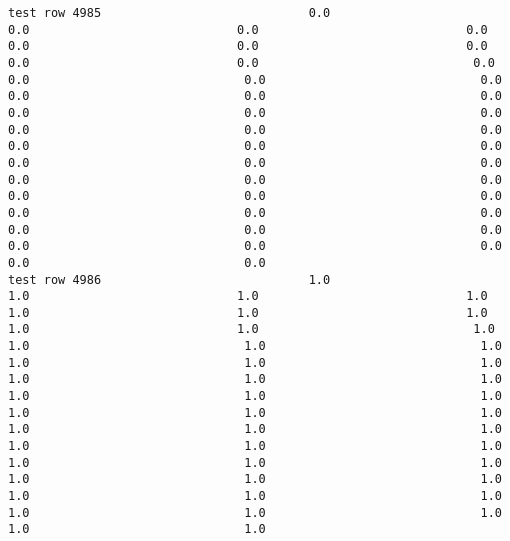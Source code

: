 \documentclass[11pt]{article}
\begin{document}
\begin{verbatim}
test row 4985                             0.0                             0.0                             0.0                             0.0                             0.0                             0.0                             0.0                             0.0                             0.0                              0.0                              0.0                              0.0                              0.0                              0.0                              0.0                              0.0                              0.0                              0.0                              0.0                              0.0                              0.0                              0.0                              0.0                              0.0                              0.0                              0.0                              0.0                              0.0                              0.0                              0.0                              0.0                              0.0                              0.0                              0.0                              0.0                              0.0                              0.0                              0.0                              0.0                              0.0                              0.0                              0.0                              0.0                              0.0                              0.0
test row 4986                             1.0                             1.0                             1.0                             1.0                             1.0                             1.0                             1.0                             1.0                             1.0                              1.0                              1.0                              1.0                              1.0                              1.0                              1.0                              1.0                              1.0                              1.0                              1.0                              1.0                              1.0                              1.0                              1.0                              1.0                              1.0                              1.0                              1.0                              1.0                              1.0                              1.0                              1.0                              1.0                              1.0                              1.0                              1.0                              1.0                              1.0                              1.0                              1.0                              1.0                              1.0                              1.0                              1.0                              1.0                              1.0

\end{verbatim}
\end{document}
